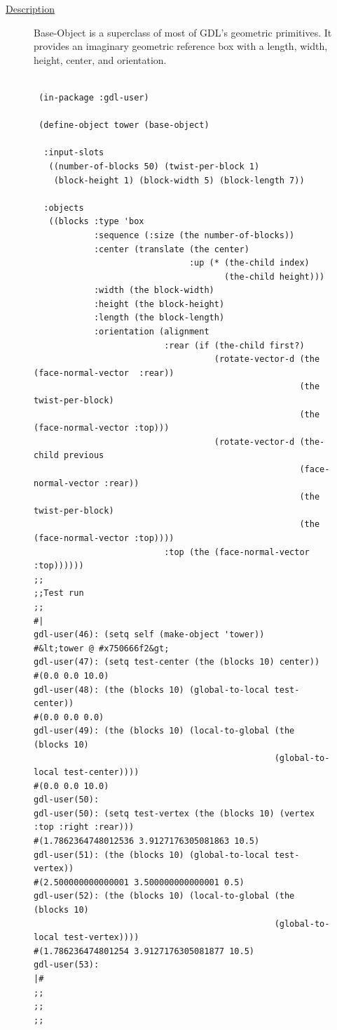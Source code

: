 \documentclass [11pt]{book}
\begin{document}
\begin{itemize}
\begin{description}

\item [
\underline{Description}]


Base-Object is a superclass of most of GDL's geometric primitives. It 
provides an imaginary geometric reference box with a length, width, height, center, 
and orientation.



\end{description}




\begin{figure}
\begin{lrbox}{\boxedverb}
\begin{minipage}{\linewidth}
{\small

\begin{verbatim}

 (in-package :gdl-user)

 (define-object tower (base-object)
  
  :input-slots 
   ((number-of-blocks 50) (twist-per-block 1)
    (block-height 1) (block-width 5) (block-length 7))
  
  :objects
   ((blocks :type 'box
            :sequence (:size (the number-of-blocks))
            :center (translate (the center) 
                               :up (* (the-child index) 
                                      (the-child height)))
            :width (the block-width) 
            :height (the block-height) 
            :length (the block-length)
            :orientation (alignment 
                          :rear (if (the-child first?)
                                    (rotate-vector-d (the (face-normal-vector  :rear))
                                                     (the twist-per-block)
                                                     (the (face-normal-vector :top)))
                                    (rotate-vector-d (the-child previous 
                                                     (face-normal-vector :rear))
                                                     (the twist-per-block)
                                                     (the (face-normal-vector :top))))
                          :top (the (face-normal-vector :top))))))
;;
;;Test run
;;
#|
gdl-user(46): (setq self (make-object 'tower))
#&lt;tower @ #x750666f2&gt;
gdl-user(47): (setq test-center (the (blocks 10) center))
#(0.0 0.0 10.0)
gdl-user(48): (the (blocks 10) (global-to-local test-center))
#(0.0 0.0 0.0)
gdl-user(49): (the (blocks 10) (local-to-global (the (blocks 10) 
                                                (global-to-local test-center))))
#(0.0 0.0 10.0)
gdl-user(50): 
gdl-user(50): (setq test-vertex (the (blocks 10) (vertex :top :right :rear)))
#(1.7862364748012536 3.9127176305081863 10.5)
gdl-user(51): (the (blocks 10) (global-to-local test-vertex))
#(2.500000000000001 3.500000000000001 0.5)
gdl-user(52): (the (blocks 10) (local-to-global (the (blocks 10) 
                                                (global-to-local test-vertex))))
#(1.786236474801254 3.9127176305081877 10.5)
gdl-user(53): 
|#
;;
;;
;;



\end{verbatim}}
\end{minipage}
\end{lrbox}
\end{figure}
\end{itemize}
\end{document}

